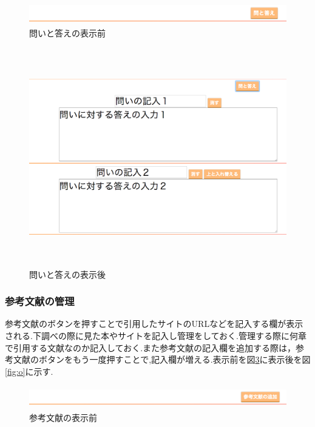 \documentclass[a4j,12pt]{jarticle}
\begin{document}
\begin{figure}[h]
\begin{center}
 \includegraphics[clip,width=150mm,height=10mm]{figure/04qanda.png}
\end{center}
 \caption{問いと答えの表示前}
 \label{fig:l}
\end{figure}

\begin{figure}[h]
\begin{center}
 \includegraphics[clip,width=150mm,height=95mm]{figure/05qanda.png}
\end{center}
 \caption{問いと答えの表示後}
 \label{fig:m}
\end{figure}
\newpage

\subsubsection{参考文献の管理}
参考文献のボタンを押すことで引用したサイトのURLなどを記入する欄が表示される.下調べの際に見た本やサイトを記入し管理をしておく.管理する際に何章で引用する文献なのか記入しておく.また参考文献の記入欄を追加する際は，参考文献のボタンをもう一度押すことで,記入欄が増える.表示前を図\ref{fig:n}に表示後を図\ref{fig:o}に示す.

\begin{figure}[h]
\begin{center}
 \includegraphics[clip,width=150mm,height=10mm]{figure/06sankou.png}
\end{center}
 \caption{参考文献の表示前}
 \label{fig:n}
\end{figure}
\end{document}
